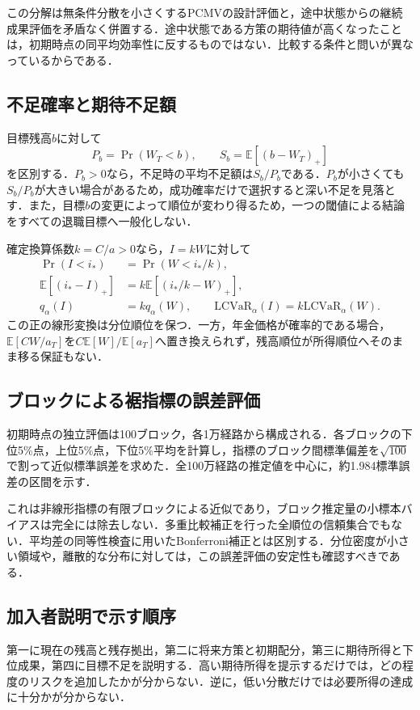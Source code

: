 \documentclass[11pt,a4paper]{article}
\numberwithin{equation}{section}
\numberwithin{table}{section}
\numberwithin{figure}{section}
\theoremstyle{plain}
\theoremstyle{definition}
\newcommand{\E}{\mathbb{E}}
\begin{document}
この分解は無条件分散を小さくするPCMVの設計評価と，途中状態からの継続成果評価を矛盾なく併置する．途中状態である方策の期待値が高くなったことは，初期時点の同平均効率性に反するものではない．比較する条件と問いが異なっているからである．

\subsection{不足確率と期待不足額}
目標残高$b$に対して
\begin{equation}
P_b=\Pr(W_T<b),\qquad S_b=\E[(b-W_T)_+]
\end{equation}
を区別する．$P_b>0$なら，不足時の平均不足額は$S_b/P_b$である．$P_b$が小さくても$S_b/P_b$が大きい場合があるため，成功確率だけで選択すると深い不足を見落とす．また，目標$b$の変更によって順位が変わり得るため，一つの閾値による結論をすべての退職目標へ一般化しない．

確定換算係数$k=C/a>0$なら，$I=kW$に対して
\begin{align}
\Pr(I<i_*)&=\Pr(W<i_*/k),\\
\E[(i_*-I)_+]&=k\E[(i_*/k-W)_+],\\
q_\alpha(I)&=kq_\alpha(W),\qquad
\mathrm{LCVaR}_\alpha(I)=k\mathrm{LCVaR}_\alpha(W).
\end{align}
この正の線形変換は分位順位を保つ．一方，年金価格が確率的である場合，$\E[CW/a_T]$を$C\E[W]/\E[a_T]$へ置き換えられず，残高順位が所得順位へそのまま移る保証もない．

\subsection{ブロックによる裾指標の誤差評価}
初期時点の独立評価は100ブロック，各1万経路から構成される．各ブロックの下位5\%点，上位5\%点，下位5\%平均を計算し，指標のブロック間標準偏差を$\sqrt{100}$で割って近似標準誤差を求めた．全100万経路の推定値を中心に，約1.984標準誤差の区間を示す．

これは非線形指標の有限ブロックによる近似であり，ブロック推定量の小標本バイアスは完全には除去しない．多重比較補正を行った全順位の信頼集合でもない．平均差の同等性検査に用いたBonferroni補正とは区別する．分位密度が小さい領域や，離散的な分布に対しては，この誤差評価の安定性も確認すべきである．

\subsection{加入者説明で示す順序}
第一に現在の残高と残存拠出，第二に将来方策と初期配分，第三に期待所得と下位成果，第四に目標不足を説明する．高い期待所得を提示するだけでは，どの程度のリスクを追加したかが分からない．逆に，低い分散だけでは必要所得の達成に十分かが分からない．
\end{document}
